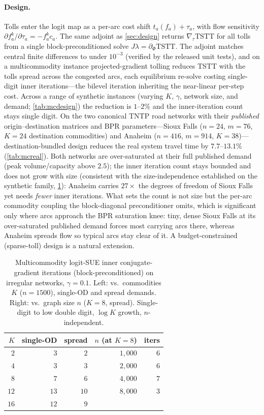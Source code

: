 \documentclass[ijoc]{informs3}
\begin{document}
\paragraph{Design.}
Tolls enter the logit map as a per-arc cost shift $t_a(f_a)+\tau_a$, with flow sensitivity
$\partial f^k_a/\partial\tau_a=-f^k_a c_a$. The same adjoint as \cref{sec:design} returns $\nabla_\tau\mathrm{TSTT}$
for all tolls from a single block-preconditioned solve $J\lambda=\partial_\Phi\mathrm{TSTT}$. The adjoint matches
central finite differences to under $10^{-3}$ (verified by the released unit tests), and on a multicommodity
instance projected-gradient tolling reduces TSTT with the tolls spread across the congested arcs, each
equilibrium re-solve costing single-digit inner iterations---the bilevel iteration inheriting the near-linear
per-step cost. Across a range of synthetic instances (varying $K$, $\gamma$,
network size, and demand; \cref{tab:mcdesign}) the reduction is $1$--$2\%$ and the inner-iteration count stays
single digit. On the two canonical TNTP road networks with their \emph{published} origin--destination matrices
and BPR parameters---Sioux Falls ($n=24$, $m=76$, $K=24$ destination commodities) and Anaheim ($n=416$, $m=914$,
$K=38$)---destination-bundled design reduces the real system travel time by $7.7$--$13.1\%$ (\cref{tab:mcreal}). Both
networks are over-saturated at their full published demand (peak volume/capacity above $2.5$); the inner
iteration count stays bounded and does not grow with size (consistent with the size-independence
established on the synthetic family, \cref{tab:mc}): Anaheim carries $27\times$ the degrees of freedom of Sioux
Falls yet needs \emph{fewer} inner iterations. What sets the count is not size but the per-arc commodity coupling
the block-diagonal preconditioner omits, which is significant only where arcs approach the BPR saturation knee:
tiny, dense Sioux Falls at its over-saturated published demand forces most carrying arcs there, whereas Anaheim
spreads flow so typical arcs stay clear of it. A budget-constrained (sparse-toll) design is a natural extension.

\begin{table}[t]\centering
\caption{Multicommodity logit-SUE inner conjugate-gradient iterations (block-preconditioned) on irregular
networks, $\gamma=0.1$. Left: vs.\ commodities $K$ ($n=1500$), single-OD and spread demands. Right: vs.\ graph
size $n$ ($K=8$, spread). Single-digit to low double digit, $\log K$ growth, $n$-independent.}
\label{tab:mc}
\begin{tabular}{rrr@{\qquad}rr}\toprule
$K$ & single-OD & spread & $n$ (at $K{=}8$) & iters\\\midrule
$2$  & $3$  & $2$  & $1{,}000$ & $6$\\
$4$  & $3$  & $3$  & $2{,}000$ & $6$\\
$8$  & $7$  & $6$  & $4{,}000$ & $7$\\
$12$ & $13$ & $10$ & $8{,}000$ & $3$\\
$16$ & $12$ & $9$  &           &  \\\bottomrule
\end{tabular}
\end{table}
\end{document}
